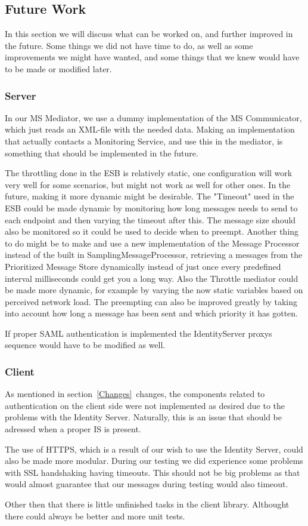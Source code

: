 \subsection{Future Work}\label{Future Work}
    In this section we will discuss what can be worked on, and further improved in the future. Some things we did not have time to do, as well as some improvements we might have wanted, and some things that we knew would have to be made or modified later.

    \subsubsection{Server}\label{Future:Server}
        In our MS Mediator, we use a dummy implementation of the MS Communicator, which just reads an XML-file with the needed data. Making an implementation that actually contacts a Monitoring Service, and use this in the mediator, is something that should be implemented in the future.

        The throttling done in the ESB is relatively static, one configuration will work very well for some scenarios, but might not work as well for other ones. In the future, making it more dynamic might be desirable. The "Timeout" used in the ESB could be made dynamic by monitoring how long messages needs to send to each endpoint and then varying the timeout after this. The message size should also be monitored so it could be used to decide when to preempt. Another thing to do might be to make and use a new implementation of the Message Processor instead of the built in SamplingMessageProcessor, retrieving a messages from the Prioritized Message Store dynamically instead of just once every predefined interval milliseconds could get you a long way. Also the Throttle mediator could be made more dynamic, for example by varying the now static variables based on perceived network load. The preempting can also be improved greatly by taking into account how long a message has been sent and which priority it has 
gotten.

        If proper SAML authentication is implemented the IdentityServer proxys sequence would have to be modified as well.

	\subsubsection{Client}\label{Future:Client}
		As mentioned in section~\ref{Changes}~changes, the components related to authentication on the client side were not implemented as desired due to the problems with the Identity Server. Naturally, this is an issue that should be adressed when a proper IS is present.

		The use of HTTPS, which is a result of our wish to use the Identity Server, could also be made more modular. During our testing we did experience some problems with SSL handshaking having timeouts. This should not be big problems as that would almost guarantee that our messages during testing would also timeout.
		
    	Other then that there is little unfinished tasks in the client library. Althought there could always be better and more unit tests. 

